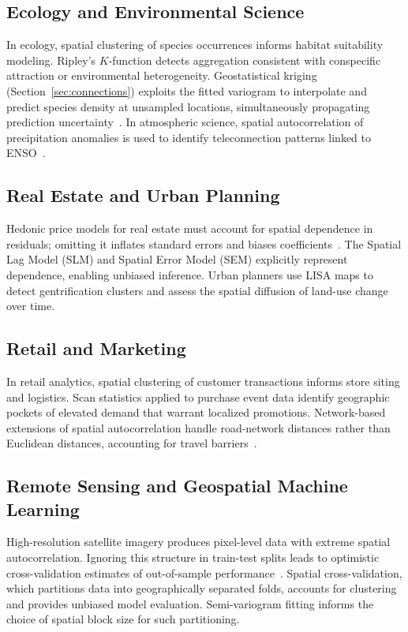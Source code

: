 \documentclass[conference]{IEEEtran}
\theoremstyle{definition}
\begin{document}
\subsection{Ecology and Environmental Science}

In ecology, spatial clustering of species occurrences informs habitat suitability modeling. Ripley's $K$-function detects aggregation consistent with conspecific attraction or environmental heterogeneity. Geostatistical kriging (Section~\ref{sec:connections}) exploits the fitted variogram to interpolate and predict species density at unsampled locations, simultaneously propagating prediction uncertainty~\cite{cressie1993}. In atmospheric science, spatial autocorrelation of precipitation anomalies is used to identify teleconnection patterns linked to ENSO~\cite{trenberth1998}.

\subsection{Real Estate and Urban Planning}

Hedonic price models for real estate must account for spatial dependence in residuals; omitting it inflates standard errors and biases coefficients~\cite{anselin1988}. The Spatial Lag Model (SLM) and Spatial Error Model (SEM) explicitly represent dependence, enabling unbiased inference. Urban planners use LISA maps to detect gentrification clusters and assess the spatial diffusion of land-use change over time.

\subsection{Retail and Marketing}

In retail analytics, spatial clustering of customer transactions informs store siting and logistics. Scan statistics applied to purchase event data identify geographic pockets of elevated demand that warrant localized promotions. Network-based extensions of spatial autocorrelation handle road-network distances rather than Euclidean distances, accounting for travel barriers~\cite{okabe2012}.

\subsection{Remote Sensing and Geospatial Machine Learning}

High-resolution satellite imagery produces pixel-level data with extreme spatial autocorrelation. Ignoring this structure in train-test splits leads to optimistic cross-validation estimates of out-of-sample performance~\cite{roberts2017}. Spatial cross-validation, which partitions data into geographically separated folds, accounts for clustering and provides unbiased model evaluation. Semi-variogram fitting informs the choice of spatial block size for such partitioning.
\end{document}
